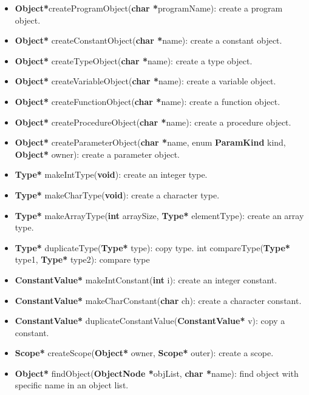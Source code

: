 \documentclass[12pt, a4paper]{report}
\begin{document}
					\begin{itemize}
						\item \textbf{Object*}createProgramObject(\textbf{char *}programName): create a program object.
						\item \textbf{Object*} createConstantObject(\textbf{char *}name): create a constant object.
						\item \textbf{Object*} createTypeObject(\textbf{char *}name): create a type object.
						\item \textbf{Object*} createVariableObject(\textbf{char *}name): create a variable object.
						\item \textbf{Object*} createFunctionObject(\textbf{char *}name): create a function object.
						\item \textbf{Object*} createProcedureObject(\textbf{char *}name): create a procedure object.
						\item \textbf{Object*} createParameterObject(\textbf{char *}name, enum \textbf{ParamKind} kind, \textbf{Object*} owner): create a parameter object.
						
						\item \textbf{Type*} makeIntType(\textbf{void}): create an integer type.
						\item \textbf{Type*} makeCharType(\textbf{void}): create a character type.
						\item \textbf{Type*} makeArrayType(\textbf{int} arraySize, \textbf{Type*} elementType): create an array type.
						\item \textbf{Type*} duplicateType(\textbf{Type*} type): copy type.
						int compareType(\textbf{Type*} type1, \textbf{Type*} type2): compare type
						
						\item \textbf{ConstantValue*} makeIntConstant(\textbf{int} i): create an integer constant.
						\item \textbf{ConstantValue*} makeCharConstant(\textbf{char} ch): create a character constant.
						\item \textbf{ConstantValue*} duplicateConstantValue(\textbf{ConstantValue*} v): copy a constant.
						
						\item \textbf{Scope*} createScope(\textbf{Object*} owner, \textbf{Scope*} outer): create a scope.
						\item \textbf{Object*} findObject(\textbf{ObjectNode *}objList, \textbf{char *}name): find object with specific name in an object list.
					\end{itemize}
\end{document}
